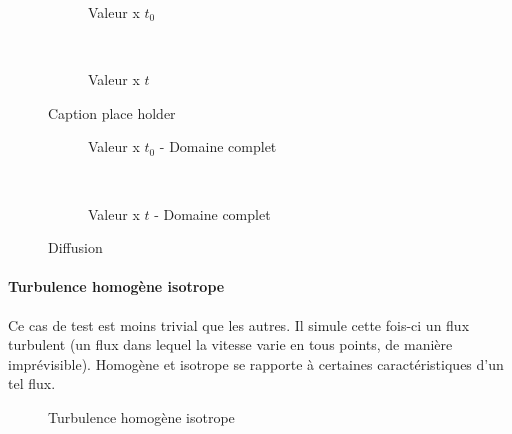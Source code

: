 
\begin{figure}[t!]
  \centering
  \begin{subfigure}[b]{0.5\textwidth}
    \centering
    \caption{\label{fig:diff_0}Valeur x $t_0$}
  \end{subfigure}%
  ~ 
  \begin{subfigure}[b]{0.5\textwidth}
    \centering
    \caption{\label{fig:diff_325}Valeur x $t$}
  \end{subfigure}
  \caption{Caption place holder}
  \centering
  \begin{subfigure}[b]{0.5\textwidth}
    \centering
    \caption{\label{fig:diff_0_domain}Valeur x $t_0$ - Domaine complet}
  \end{subfigure}%
  ~ 
  \begin{subfigure}[b]{0.5\textwidth}
    \centering
    \caption{\label{fig:diff_325_domain}Valeur x $t$ - Domaine complet}
  \end{subfigure}
  \caption{\label{fig:diff_}Diffusion}
\end{figure}



\paragraph{Turbulence homogène isotrope}Ce cas de test est moins trivial que les autres. Il simule cette fois-ci un flux turbulent (un flux dans lequel la vitesse varie en tous points, de manière imprévisible). Homogène et isotrope se rapporte à certaines caractéristiques d'un tel flux. 

\begin{figure}[ht]
  \centering
  \caption{\label{fig:turbiso}Turbulence homogène isotrope}
\end{figure}



